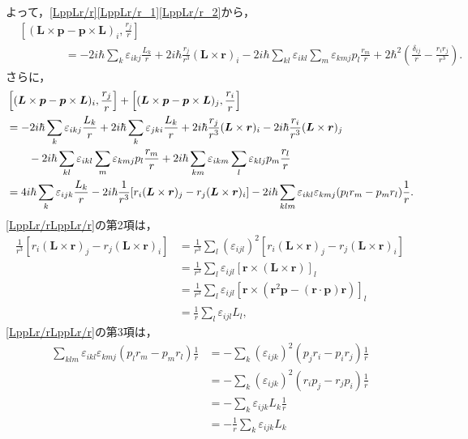 よって，\eqref{LppLr/r}\eqref{LppLr/r_1}\eqref{LppLr/r_2}から，
\begin{align*}
  & \left[(\boldsymbol{L}\times\boldsymbol{p} - \boldsymbol{p}\times\boldsymbol{L})_i,\frac{r_j}{r}\right] \\
  & \qquad \qquad = - 2i\hbar\sum_{k}\varepsilon_{ikj}\frac{L_k}{r} + 2i\hbar\frac{r_j}{r^3}(\boldsymbol{L}\times\boldsymbol{r})_i - 2i\hbar\sum_{kl}\varepsilon_{ikl}\sum_m\varepsilon_{kmj}p_l\frac{r_m}{r} + 2\hbar^2\left(\frac{\delta_{ij}}{r} - \frac{r_ir_j}{r^3}\right).
\end{align*}
さらに，
\begin{align}
  & \left[(\boldsymbol{L}\times\boldsymbol{p} - \boldsymbol{p}\times\boldsymbol{L})_i,\frac{r_j}{r}\right] + \left[(\boldsymbol{L}\times\boldsymbol{p} - \boldsymbol{p}\times\boldsymbol{L})_j,\frac{r_i}{r}\right]\notag\\
  & = - 2i\hbar\sum_k\varepsilon_{ikj}\frac{L_k}{r} + 2i\hbar\sum_k\varepsilon_{jki}\frac{L_k}{r} + 2i\hbar\frac{r_j}{r^3}(\boldsymbol{L}\times\boldsymbol{r})_i - 2i\hbar\frac{r_i}{r^3}(\boldsymbol{L}\times\boldsymbol{r})_j\notag\\
  & \qquad - 2i\hbar\sum_{kl}\varepsilon_{ikl}\sum_m\varepsilon_{kmj}p_l\frac{r_m}{r} + 2i\hbar\sum_{km}\varepsilon_{ikm}\sum_l\varepsilon_{klj}p_m\frac{r_l}{r}\notag\\
  & = 4i\hbar\sum_k\varepsilon_{ijk}\frac{L_k}{r} - 2i\hbar\frac{1}{r^3}[r_i(\boldsymbol{L}\times\boldsymbol{r})_j - r_j(\boldsymbol{L}\times\boldsymbol{r})_i] - 2i\hbar\sum_{klm}\varepsilon_{ikl}\varepsilon_{kmj}(p_lr_m - p_mr_l)\frac{1}{r}.\label{LppLr/rLppLr/r}
\end{align}
\eqref{LppLr/rLppLr/r}の第2項は，
\begin{align*}
  \frac{1}{r^3}[r_i(\boldsymbol{L}\times\boldsymbol{r})_j - r_j(\boldsymbol{L}\times\boldsymbol{r})_i]
  & = \frac{1}{r^3}\sum_l(\varepsilon_{ijl})^2[r_i(\boldsymbol{L}\times\boldsymbol{r})_j - r_j(\boldsymbol{L}\times\boldsymbol{r})_i]\\
  & = \frac{1}{r^3}\sum_l\varepsilon_{ijl}[\boldsymbol{r}\times(\boldsymbol{L}\times\boldsymbol{r})]_l\\
  & = \frac{1}{r^3}\sum_l\varepsilon_{ijl}[\boldsymbol{r}\times(\boldsymbol{r}^2\boldsymbol{p} - (\boldsymbol{r}\cdot\boldsymbol{p})\boldsymbol{r})]_l\\
  & = \frac{1}{r}\sum_l\varepsilon_{ijl}L_l,
\end{align*}
\eqref{LppLr/rLppLr/r}の第3項は，
\begin{align*}
  \sum_{klm}\varepsilon_{ikl}\varepsilon_{kmj}(p_lr_m - p_mr_l)\frac{1}{r}
  & = - \sum_k(\varepsilon_{ijk})^2(p_jr_i - p_ir_j)\frac{1}{r}\\
  & = - \sum_k(\varepsilon_{ijk})^2(r_ip_j - r_jp_i)\frac{1}{r}\\
  & = - \sum_k\varepsilon_{ijk}L_k\frac{1}{r}\\
  & = - \frac{1}{r}\sum_k\varepsilon_{ijk}L_k
\end{align*}
